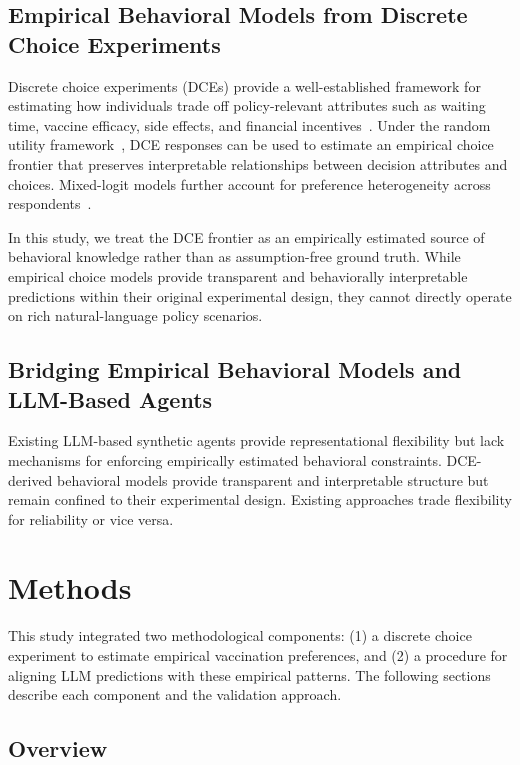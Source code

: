 \documentclass[12pt]{article}
\begin{document}
\subsection{Empirical Behavioral Models from Discrete Choice Experiments}

Discrete choice experiments (DCEs) provide a well-established framework for estimating how individuals trade off policy-relevant attributes such as waiting time, vaccine efficacy, side effects, and financial incentives~\citep{Soekhai2019a, Chan2024}. Under the random utility framework~\citep{Train2009, louviere2000stated}, DCE responses can be used to estimate an empirical choice frontier that preserves interpretable relationships between decision attributes and choices. Mixed-logit models further account for preference heterogeneity across respondents~\citep{hensher2003mixed, hensher2015applied}.

In this study, we treat the DCE frontier as an empirically estimated source of behavioral knowledge rather than as assumption-free ground truth. While empirical choice models provide transparent and behaviorally interpretable predictions within their original experimental design, they cannot directly operate on rich natural-language policy scenarios.

\subsection{Bridging Empirical Behavioral Models and LLM-Based Agents}

Existing LLM-based synthetic agents provide representational flexibility but lack mechanisms for enforcing empirically estimated behavioral constraints\citep{li2026position, tornberg2025validation}. DCE-derived behavioral models provide transparent and interpretable structure but remain confined to their experimental design. Existing approaches trade flexibility for reliability or vice versa.

\section{Methods}
\label{sec:methods}

This study integrated two methodological components: (1) a discrete choice experiment to estimate empirical vaccination preferences, and (2) a procedure for aligning LLM predictions with these empirical patterns. The following sections describe each component and the validation approach.

\subsection{Overview}
\end{document}

